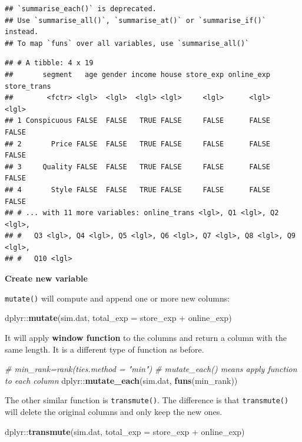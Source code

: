 \documentclass[]{book}
\newenvironment{Shaded}{\begin{snugshade}}{\end{snugshade}}
\newcommand{\KeywordTok}[1]{\textcolor[rgb]{0.13,0.29,0.53}{\textbf{{#1}}}}
\newcommand{\DataTypeTok}[1]{\textcolor[rgb]{0.13,0.29,0.53}{{#1}}}
\newcommand{\StringTok}[1]{\textcolor[rgb]{0.31,0.60,0.02}{{#1}}}
\newcommand{\CommentTok}[1]{\textcolor[rgb]{0.56,0.35,0.01}{\textit{{#1}}}}
\newcommand{\NormalTok}[1]{{#1}}
\theoremstyle{definition}
\theoremstyle{definition}
\theoremstyle{remark}
\begin{document}
\begin{verbatim}
## `summarise_each()` is deprecated.
## Use `summarise_all()`, `summarise_at()` or `summarise_if()` instead.
## To map `funs` over all variables, use `summarise_all()`
\end{verbatim}

\begin{verbatim}
## # A tibble: 4 x 19
##       segment   age gender income house store_exp online_exp store_trans
##        <fctr> <lgl>  <lgl>  <lgl> <lgl>     <lgl>      <lgl>       <lgl>
## 1 Conspicuous FALSE  FALSE   TRUE FALSE     FALSE      FALSE       FALSE
## 2       Price FALSE  FALSE   TRUE FALSE     FALSE      FALSE       FALSE
## 3     Quality FALSE  FALSE   TRUE FALSE     FALSE      FALSE       FALSE
## 4       Style FALSE  FALSE   TRUE FALSE     FALSE      FALSE       FALSE
## # ... with 11 more variables: online_trans <lgl>, Q1 <lgl>, Q2 <lgl>,
## #   Q3 <lgl>, Q4 <lgl>, Q5 <lgl>, Q6 <lgl>, Q7 <lgl>, Q8 <lgl>, Q9 <lgl>,
## #   Q10 <lgl>
\end{verbatim}

\textbf{Create new variable}

\texttt{mutate()} will compute and append one or more new columns:

\begin{Shaded}
\begin{Highlighting}[]
\NormalTok{dplyr::}\KeywordTok{mutate}\NormalTok{(sim.dat, }\DataTypeTok{total_exp =} \NormalTok{store_exp +}\StringTok{ }\NormalTok{online_exp)}
\end{Highlighting}
\end{Shaded}

It will apply \textbf{window function} to the columns and return a
column with the same length. It is a different type of function as
before.

\begin{Shaded}
\begin{Highlighting}[]
\CommentTok{# min_rank=rank(ties.method = "min")}
\CommentTok{# mutate_each() means apply function to each column}
\NormalTok{dplyr::}\KeywordTok{mutate_each}\NormalTok{(sim.dat, }\KeywordTok{funs}\NormalTok{(min_rank)) }
\end{Highlighting}
\end{Shaded}

The other similar function is \texttt{transmute()}. The difference is
that \texttt{transmute()} will delete the original columns and only keep
the new ones.

\begin{Shaded}
\begin{Highlighting}[]
\NormalTok{dplyr::}\KeywordTok{transmute}\NormalTok{(sim.dat, }\DataTypeTok{total_exp =} \NormalTok{store_exp +}\StringTok{ }\NormalTok{online_exp) }
\end{Highlighting}
\end{Shaded}
\end{document}
